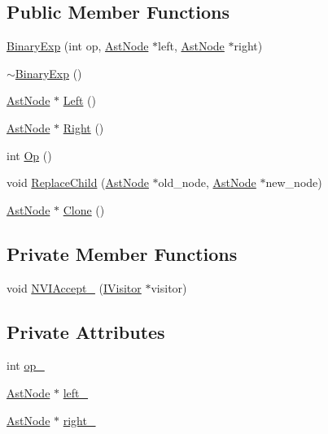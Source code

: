 \subsection*{Public Member Functions}
\begin{DoxyCompactItemize}
\item 
\hyperlink{classmocha_1_1_binary_exp_a4a6151f22fb83c7b6e958103543901e2}{BinaryExp} (int op, \hyperlink{classmocha_1_1_ast_node}{AstNode} $\ast$left, \hyperlink{classmocha_1_1_ast_node}{AstNode} $\ast$right)
\item 
\hyperlink{classmocha_1_1_binary_exp_aa64a52bc2abaafac6d30b122a5eac880}{$\sim$BinaryExp} ()
\item 
\hyperlink{classmocha_1_1_ast_node}{AstNode} $\ast$ \hyperlink{classmocha_1_1_binary_exp_aff0c16fd0b2fc8a186bd749fb9020e38}{Left} ()
\item 
\hyperlink{classmocha_1_1_ast_node}{AstNode} $\ast$ \hyperlink{classmocha_1_1_binary_exp_ac22eeeeee93ef31b170519c4bace8cd9}{Right} ()
\item 
int \hyperlink{classmocha_1_1_binary_exp_a698d95fb3cc21ae19b87e74622a76683}{Op} ()
\item 
void \hyperlink{classmocha_1_1_binary_exp_a3e6534281bf4c610222b1ad6ec752625}{ReplaceChild} (\hyperlink{classmocha_1_1_ast_node}{AstNode} $\ast$old\_\-node, \hyperlink{classmocha_1_1_ast_node}{AstNode} $\ast$new\_\-node)
\item 
\hyperlink{classmocha_1_1_ast_node}{AstNode} $\ast$ \hyperlink{classmocha_1_1_binary_exp_a035d97865c0512e2902192f8ed840ae4}{Clone} ()
\end{DoxyCompactItemize}
\subsection*{Private Member Functions}
\begin{DoxyCompactItemize}
\item 
void \hyperlink{classmocha_1_1_binary_exp_ac7feb22c02d0432e40486b76997f505e}{NVIAccept\_\-} (\hyperlink{classmocha_1_1_i_visitor}{IVisitor} $\ast$visitor)
\end{DoxyCompactItemize}
\subsection*{Private Attributes}
\begin{DoxyCompactItemize}
\item 
int \hyperlink{classmocha_1_1_binary_exp_acc6841e04f10973e484979d4066a532f}{op\_\-}
\item 
\hyperlink{classmocha_1_1_ast_node}{AstNode} $\ast$ \hyperlink{classmocha_1_1_binary_exp_acc7f47a0ae80042c528250d881f78a90}{left\_\-}
\item 
\hyperlink{classmocha_1_1_ast_node}{AstNode} $\ast$ \hyperlink{classmocha_1_1_binary_exp_abf7760f6928cbc7941bb98a658d927fc}{right\_\-}
\end{DoxyCompactItemize}


